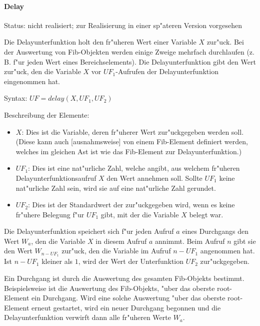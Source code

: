 

\paragraph{Delay}

Status: nicht realisiert; zur Realisierung in einer sp"ateren Version vorgesehen

\bigskip\noindent
Die Delayunterfunktion holt den fr"uheren Wert einer Variable $X$ zur"uck. Bei der Auswertung von Fib-Objekten werden einige Zweige mehrfach durchlaufen (z. B. f"ur jeden Wert eines Bereichselements). Die Delayunterfunktion gibt den Wert zur"uck, den die Variable $X$ vor $UF_1$-Aufrufen der Delayunterfunktion eingenommen hat.

\bigskip\noindent
Syntax:
$UF=delay( X, UF_1, UF_2 )$

\bigskip\noindent
Beschreibung der Elemente:
\begin{itemize}
 \item $X$: Dies ist die Variable, deren fr"uherer Wert zur"uckgegeben werden soll. (Diese kann auch [ausnahmsweise] von einem Fib-Element definiert werden, welches im gleichen Ast ist wie das Fib-Element zur Delayunterfunktion.) %
 \item $UF_1$: Dies ist eine nat"urliche Zahl, welche angibt, aus welchem fr"uheren Delayunterfunktionsaufruf $X$ den Wert annehmen soll. Sollte $UF_1$ keine nat"urliche Zahl sein, wird sie auf eine nat"urliche Zahl gerundet.
 \item $UF_2$: Dies ist der Standardwert der zur"uckgegeben wird, wenn es keine fr"uhere Belegung f"ur $UF_1$ gibt, mit der die Variable $X$ belegt war.
\end{itemize}
Die Delayunterfunktion speichert sich f"ur jeden Aufruf $a$ eines Durchgangs den Wert $W_a$, den die Variable $X$ in diesem Aufruf $a$ annimmt. Beim Aufruf $n$ gibt sie den Wert $W_{n-UF_1}$ zur"uck, den die Variable im Aufruf $n-UF_1$ angenommen hat. Ist $n-UF_1$ kleiner als $1$, wird der Wert der Unterfunktion $UF_2$ zur"uckgegeben.

Ein Durchgang ist durch die Auswertung des gesamten Fib-Objekts bestimmt. Beispielsweise ist die Auswertung des Fib-Objekts, "uber das oberste root-Element ein Durchgang. Wird eine solche Auswertung "uber das oberste root-Element erneut gestartet, wird ein neuer Durchgang begonnen und die Delayunterfunktion verwirft dann alle fr"uheren Werte $W_a$.

